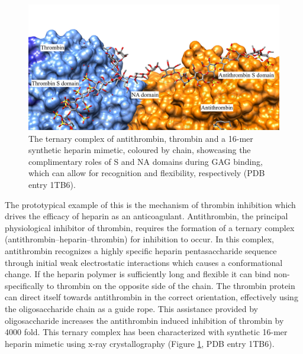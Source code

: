 \documentclass[journal=jctcce,manuscript=article]{achemso}
\begin{document}
{\begin{figure}[tl!]
    \centering
    \includegraphics[width=13cm]{AntiThrombinThrombinHeparinMimetic.jpg}
    \caption{The ternary complex of antithrombin, thrombin and a 16-mer synthetic heparin mimetic, coloured by chain, showcasing the complimentary roles of S and NA domains during GAG binding, which can allow for recognition and flexibility, respectively (PDB entry 1TB6).}
    \label{fig:ternary}
\end{figure}

The prototypical example of this is the mechanism of thrombin inhibition which drives the efficacy of heparin as an anticoagulant. \cite{Li2004StructureHeparin, Dementiev2004TheSpecificity}
Antithrombin, the principal physiological inhibitor of thrombin, requires the formation of a ternary complex (antithrombin--heparin--thrombin) for inhibition to occur.\cite{Capila2002Heparin-proteinInteractions., Nahain2018HeparinActivity} In this complex, antithrombin recognizes a highly specific heparin pentasaccharide sequence through initial weak electrostatic interactions which causes a conformational change. \cite{Li2004StructureHeparin}
If the heparin polymer is sufficiently long and flexible it can bind non-specifically to thrombin on the opposite side of the chain.\cite{Dementiev2004TheSpecificity}
The thrombin protein can direct itself towards antithrombin in the correct orientation, effectively using the oligosaccharide chain as a guide rope.\cite{Li2004StructureHeparin, Dementiev2004TheSpecificity} This assistance provided by oligosaccharide increases the antithrombin induced inhibition of thrombin by 4000 fold. \cite{Li2004StructureHeparin, Dementiev2004TheSpecificity} 
This ternary complex has been characterized with synthetic 16-mer heparin mimetic using x-ray crystallography (Figure \ref{fig:ternary}, PDB entry 1TB6).\cite{Dementiev2004TheSpecificity}

}
\end{document}
